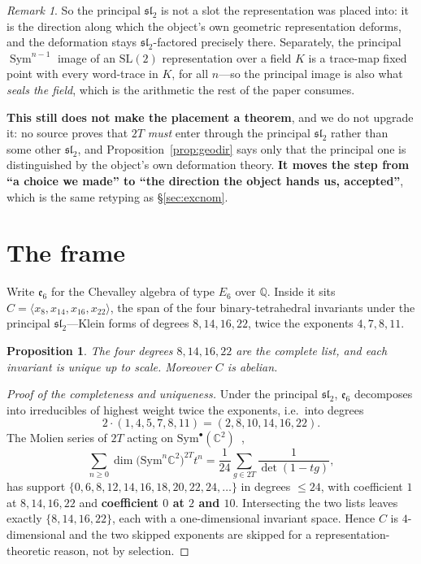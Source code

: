 \documentclass[11pt,reqno]{amsart}
\theoremstyle{plain}
\newtheorem{proposition}[theorem]{Proposition}
\theoremstyle{definition}
\theoremstyle{remark}
\newtheorem{remark}[theorem]{Remark}
\newcommand{\Q}{\mathbb{Q}}
\newcommand{\C}{\mathbb{C}}
\newcommand{\SL}{\mathrm{SL}}
\newcommand{\sll}{\mathfrak{sl}}
\newcommand{\ee}{\mathfrak{e}}
\newcommand{\Sym}{\operatorname{Sym}}
\begin{document}
\begin{remark}
So the principal $\sll_2$ is not a slot the representation was placed into: it is the
direction along which the object's own geometric representation deforms, and the
deformation stays $\sll_2$-factored precisely there. Separately, the principal
$\Sym^{n-1}$ image of an $\SL(2)$ representation over a field $K$ is a trace-map fixed
point with every word-trace in $K$, for all $n$---so the principal image is also what
\emph{seals the field}, which is the arithmetic the rest of the paper consumes.

\textbf{This still does not make the placement a theorem}, and we do not upgrade it: no
source proves that $2T$ \emph{must} enter through the principal $\sll_2$ rather than
some other $\sll_2$, and Proposition~\ref{prop:geodir} says only that the principal one
is distinguished by the object's own deformation theory. \textbf{It moves the step from
``a choice we made'' to ``the direction the object hands us, accepted''}, which is the
same retyping as \S\ref{sec:excnom}.
\end{remark}

\section{The frame}\label{sec:frame}

Write $\ee_6$ for the Chevalley algebra of type $E_6$ over $\Q$. Inside it sits
$C=\langle x_8,x_{14},x_{16},x_{22}\rangle$, the span of the four binary-tetrahedral
invariants under the principal $\sll_2$---Klein forms of degrees $8,14,16,22$, twice the
exponents $4,7,8,11$.

\begin{proposition}\label{prop:C}
The four degrees $8,14,16,22$ are the complete list, and each invariant is unique up to
scale. Moreover $C$ is abelian.
\end{proposition}

\begin{proof}[Proof of the completeness and uniqueness]
Under the principal $\sll_2$, $\ee_6$ decomposes into irreducibles of highest weight
twice the exponents, i.e.\ into degrees
\[
   2\cdot(1,4,5,7,8,11)=(2,8,10,14,16,22).
\]
The
Molien series of $2T$ acting on $\mathrm{Sym}^\bullet(\C^2)$~\cite{Molien},
\[
   \sum_{n\ge0}\dim\bigl(\mathrm{Sym}^n\C^2\bigr)^{2T}t^n
   =\frac{1}{24}\sum_{g\in 2T}\frac{1}{\det(1-tg)},
\]
has support $\{0,6,8,12,14,16,18,20,22,24,\dots\}$ in degrees $\le24$, with
coefficient $1$ at $8,14,16,22$ and \textbf{coefficient $0$ at $2$ and $10$}.
Intersecting the two lists leaves exactly $\{8,14,16,22\}$, each with a
one-dimensional invariant space. Hence $C$ is $4$-dimensional and the two skipped
exponents are skipped for a representation-theoretic reason, not by selection.
\end{proof}
\end{document}
